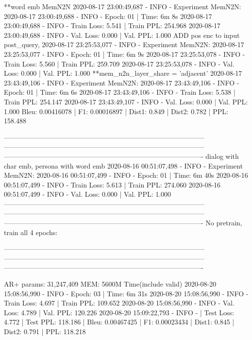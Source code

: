 \documentclass[letterpaper]{article} %
\begin{document}
\begin{CJK*}{UTF8}{gbsn}
**word emb MemN2N
2020-08-17 23:00:49,687 - INFO - Experiment MemN2N: 
2020-08-17 23:00:49,688 - INFO - Epoch: 01 | Time: 6m 8s
2020-08-17 23:00:49,688 - INFO - 	Train Loss: 5.541 | Train PPL: 254.968
2020-08-17 23:00:49,688 - INFO - 	 Val. Loss: 0.000 |  Val. PPL:   1.000
    ADD pos enc to input post_query, %
    2020-08-17 23:25:53,077 - INFO - Experiment MemN2N: 
    2020-08-17 23:25:53,077 - INFO - Epoch: 01 | Time: 6m 9s
    2020-08-17 23:25:53,078 - INFO - 	Train Loss: 5.560 | Train PPL: 259.709
    2020-08-17 23:25:53,078 - INFO - 	 Val. Loss: 0.000 |  Val. PPL:   1.000
    **mem_n2n_layer_share = 'adjacent'
    2020-08-17 23:43:49,106 - INFO - Experiment MemN2N: 
    2020-08-17 23:43:49,106 - INFO - Epoch: 01 | Time: 6m 6s
    2020-08-17 23:43:49,106 - INFO - 	Train Loss: 5.538 | Train PPL: 254.147
    2020-08-17 23:43:49,107 - INFO - 	 Val. Loss: 0.000 |  Val. PPL:   1.000
    Bleu: 0.00416078 | F1: 0.00016897 | Dist1: 0.849 | Dist2: 0.782 | PPL: 158.488

-----------------------------------------------------------------------------------------
-----------------------------------------------------------------------------------------
----------------------------------------------------------------------------------------
dialog with char emb, persona with word emb
2020-08-16 00:51:07,498 - INFO - Experiment MemN2N: 
2020-08-16 00:51:07,499 - INFO - Epoch: 01 | Time: 6m 40s
2020-08-16 00:51:07,499 - INFO - 	Train Loss: 5.613 | Train PPL: 274.060
2020-08-16 00:51:07,499 - INFO - 	 Val. Loss: 0.000 |  Val. PPL:   1.000
-----------------------------------------------------------------------------------------
-----------------------------------------------------------------------------------------
----------------------------------------------------------------------------------------
No pretrain, train all 4 epochs:

-----------------------------------------------------------------------------------------
-----------------------------------------------------------------------------------------
----------------------------------------------------------------------------------------

AR+
params: 31,247,409
MEM: 5600M
Time(include valid) 
2020-08-20 15:08:56,990 - INFO - Epoch: 03 | Time: 6m 31s
2020-08-20 15:08:56,990 - INFO - 	Train Loss: 4.697 | Train PPL: 109.652
2020-08-20 15:08:56,990 - INFO - 	 Val. Loss: 4.789 |  Val. PPL: 120.226
2020-08-20 15:09:22,793 - INFO - | Test Loss: 4.772 | Test PPL: 118.186 |
Bleu: 0.00467425 | F1: 0.00023434 | Dist1: 0.845 | Dist2: 0.791 | PPL: 118.218


\end{CJK*}
\end{document}
